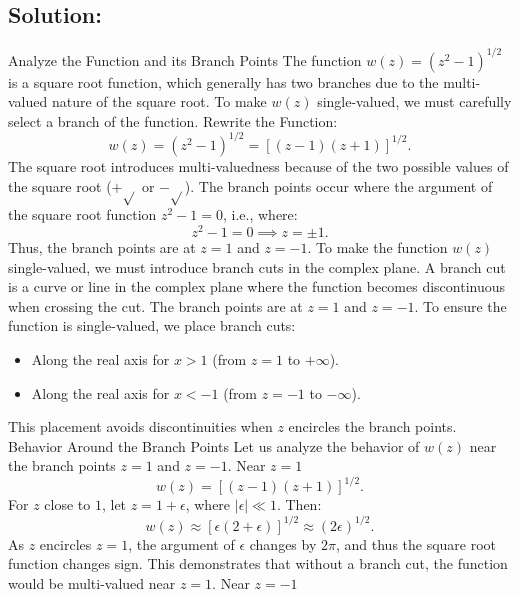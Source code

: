 \documentclass[12pt]{article}
\begin{document}
    \subsection*{Solution:}
        Analyze the Function and its Branch Points
        The function \(w(z) = (z^2 - 1)^{1/2}\) is a square root function, which generally has two branches due to the multi-valued nature of the square root. To make \(w(z)\) single-valued, we must carefully select a branch of the function.
        \newline Rewrite the Function:
        \[
        w(z) = (z^2 - 1)^{1/2} = \left[(z - 1)(z + 1)\right]^{1/2}.
        \]
        The square root introduces multi-valuedness because of the two possible values of the square root (\(+\sqrt{}\) or \(-\sqrt{}\)).
        The branch points occur where the argument of the square root function \(z^2 - 1 = 0\), i.e., where:
        \[
        z^2 - 1 = 0 \implies z = \pm 1.
        \]
        Thus, the branch points are at \(z = 1\) and \(z = -1\).
        To make the function \(w(z)\) single-valued, we must introduce branch cuts in the complex plane. A branch cut is a curve or line in the complex plane where the function becomes discontinuous when crossing the cut.
        The branch points are at \(z = 1\) and \(z = -1\). To ensure the function is single-valued, we place branch cuts:
        \begin{itemize}
            \item Along the real axis for \(x > 1\) (from \(z = 1\) to \(+\infty\)).
            \item Along the real axis for \(x < -1\) (from \(z = -1\) to \(-\infty\)).
        \end{itemize}
        This placement avoids discontinuities when \(z\) encircles the branch points.
        Behavior Around the Branch Points
        Let us analyze the behavior of \(w(z)\) near the branch points \(z = 1\) and \(z = -1\).
        \newline Near \(z = 1\)
        \[
        w(z) = \left[(z - 1)(z + 1)\right]^{1/2}.
        \]
        For \(z\) close to \(1\), let \(z = 1 + \epsilon\), where \(|\epsilon| \ll 1\). Then:
        \[
        w(z) \approx \left[\epsilon(2 + \epsilon)\right]^{1/2} \approx (2\epsilon)^{1/2}.
        \]
        As \(z\) encircles \(z = 1\), the argument of \(\epsilon\) changes by \(2\pi\), and thus the square root function changes sign. This demonstrates that without a branch cut, the function would be multi-valued near \(z = 1\).
        \newline Near \(z = -1\)
\end{document}
